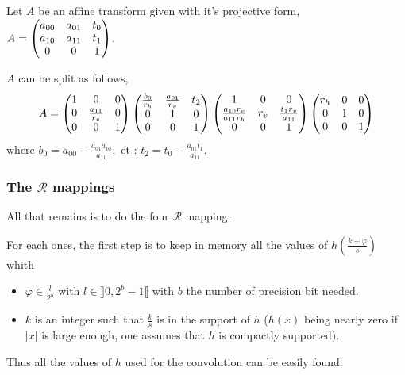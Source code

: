 		\begin{prop}
		\label{propositionDecompositionAffinite}
		Let $A$ be an affine transform given with it's projective form, $A = \begin{pmatrix} a_{00} & a_{01} & t_0\\ a_{10} & a_{11} & t_1\\ 0&0&1 \end{pmatrix}$.
		
		$A$ can be split as follows,
		\[
			A = 
			\begin{pmatrix} 1 & 0 & 0\\ 0 & \frac{a_{11}}{r_v} & 0\\ 0 & 0 & 1 \end{pmatrix}
			\begin{pmatrix} \frac{b_{0}}{r_h} & \frac{a_{01}}{r_v} & t_2\\ 0 & 1 & 0\\ 0 & 0 & 1 \end{pmatrix}
			\begin{pmatrix} 1 & 0 & 0\\ \frac{a_{10}r_v}{a_{11}r_h} & r_v & \frac{t_1r_v}{a_{11}}\\ 0 & 0 & 1 \end{pmatrix}
			\begin{pmatrix} r_h & 0 & 0\\ 0 & 1 & 0\\ 0 & 0 & 1 \end{pmatrix}
		\]
where $b_0 = a_{00} - \frac{a_{01}a_{10}}{a_{11}};$ et : $t_2 = t_0 - \frac{a_{01}t_1}{a_{11}}$.
\end{prop}
	\subsubsection{The $\mathcal R$ mappings}
		
		All that remains is to do the four $\mathcal R$ mapping.
		
		For each ones, the first step is to keep in memory all the values of $h(\frac{k+\varphi}{s})$ whith
		
\begin{itemize}
		\item $\varphi \in \frac{l}{2^b}$ with $l \in \rrbracket0,2^b-1\llbracket$ with $b$ the number of precision bit needed.
		\item $k$ is an integer such that $\frac{k}{s}$ is in the support of $h$ ($h(x)$ being nearly zero if $|x|$ is large enough, one assumes that $h$ is compactly supported).
		\end{itemize}
		Thus all the values of $h$ used for the convolution can be easily found.



